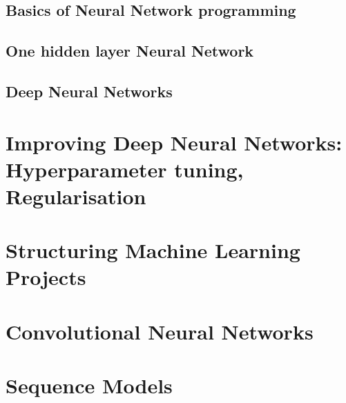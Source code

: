 \documentclass{article}
\begin{document}
\subsection{Basics of Neural Network programming}
\subsection{One hidden layer Neural Network}
\subsection{Deep Neural Networks}

\section{Improving Deep Neural Networks: Hyperparameter tuning, Regularisation}
\section{Structuring Machine Learning Projects}
\section{Convolutional Neural Networks}
\section{Sequence Models}
\end{document}
